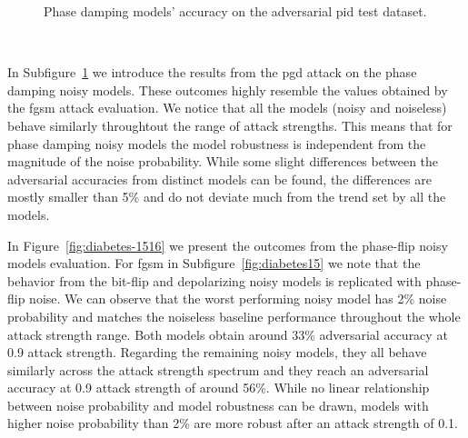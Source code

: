 \begin{figure}[!h]
\begin{subfigure}{0.45\textwidth}
      \label{fig:diabetes14}
  \end{subfigure}
  \caption{Phase damping models' accuracy on the adversarial \ac{pid} test dataset.}
  \label{fig:diabetes-1314}
\end{figure} \

In Subfigure~\ref{fig:diabetes14} we introduce the results from the \ac{pgd}
attack on the phase damping noisy models. These outcomes highly resemble
the values obtained by the \ac{fgsm} attack evaluation. We notice that
all the models (noisy and noiseless) behave similarly throughtout the
range of attack strengths. This means that for phase damping noisy models
the model robustness is independent from the magnitude of the noise
probability. While some slight differences between the adversarial
accuracies from distinct models can be found, the differences are
mostly smaller than 5\% and do not deviate much from the trend set
by all the models. \

In Figure~\ref{fig:diabetes-1516} we present the outcomes from the phase-flip
noisy models evaluation. For \ac{fgsm} in Subfigure~\ref{fig:diabetes15}
we note that the behavior from the bit-flip and depolarizing noisy models
is replicated with phase-flip noise. We can observe that the worst
performing noisy model has 2\% noise probability and matches the noiseless
baseline performance throughout the whole attack strength range. Both 
models obtain around 33\% adversarial accuracy at 0.9 attack strength.
Regarding the remaining noisy models, they all behave similarly across
the attack strength spectrum and they reach an adversarial accuracy at
0.9 attack strength of around 56\%. While no linear relationship between noise
probability and model robustness can be drawn, models with higher noise
probability than 2\% are more robust after an attack strength of 0.1. \


